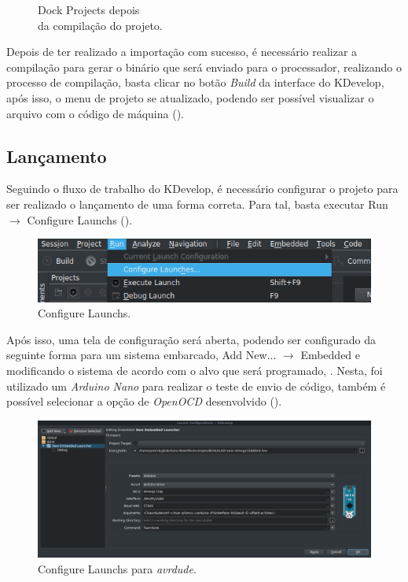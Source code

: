 \begin{figure}[!htb]
\begin{minipage}[t]{0.5\textwidth}
  \caption[Projects depois da compilação]{Dock Projects depois\\ da compilação do projeto.}
  \label{fig:projects2}
  \end{minipage}
\end{figure}

Depois de ter realizado a importação com sucesso, é necessário realizar a compilação para gerar o binário que será enviado para o processador, realizando o processo de compilação, basta clicar no botão \textit{Build} da interface do KDevelop, após isso, o menu de projeto se atualizado, podendo ser possível visualizar o arquivo com o código de máquina ().

\subsection{Lançamento}

Seguindo o fluxo de trabalho do KDevelop, é necessário configurar o projeto para ser realizado o lançamento de uma forma correta. Para tal, basta executar Run $\rightarrow$ Configure Launchs ().

\begin{figure}[!htb]
  \centering
  \includegraphics[width=1\textwidth]{figuras/run.png}
  \caption[Configure Launchs]{Configure Launchs.}
  \label{fig:run}
\end{figure}

Após isso, uma tela de configuração será aberta, podendo ser configurado da seguinte forma para um sistema embarcado, Add New... $\rightarrow$ Embedded e modificando o sistema de acordo com o alvo que será programado, . Nesta, foi utilizado um \textit{Arduino Nano} para realizar o teste de envio de código, também é possível selecionar a opção de \textit{OpenOCD} desenvolvido ().

\begin{figure}[!htb]
  \centering
  \includegraphics[width=1\textwidth]{figuras/run2.png}
  \caption[\textit{Configure Launchs} para \textit{avrdude}]{Configure Launchs para \textit{avrdude}.}
  \label{fig:run2}
\end{figure}

